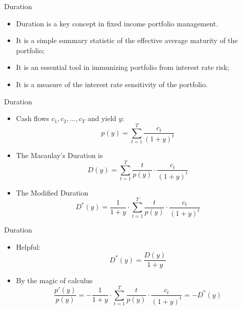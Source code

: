 \documentclass{beamer}
\begin{document}
\begin{frame}{Duration}
    \begin{itemize}
        \item Duration is a key concept in fixed income portfolio management. 
        \item  It is a simple summary statistic of the effective average maturity of the portfolio;
        \item  It is an essential tool in immunizing portfolio from interest rate risk;
        \item  It is a measure of the interest rate sensitivity of the portfolio.
    \end{itemize}
\end{frame}

\begin{frame}{Duration}
\begin{itemize}
\item Cash flows $c_{1},c_{2},\ldots,c_{T}$ and yield $y$:
\begin{equation}
p(y)=\sum_{t=1}^{T}{\frac{c_{t}}{(1+y)^{t}}}
\end{equation}
\item The Macaulay's Duration is
    \begin{equation}
        D(y)=\sum_{t=1}^{T}{\frac{t}{p(y)}\cdot\frac{c_{t}}{(1+y)^{t}}}
    \end{equation}
\item The Modified Duration
    \begin{equation}
        D^{*}(y)=\frac{1}{1+y}\cdot\sum_{t=1}^{T}{\frac{t}{p(y)}\cdot\frac{c_{t}}{(1+y)^{t}}}
    \end{equation}
\end{itemize}
\end{frame}

\begin{frame}{Duration}
\begin{itemize}
    \item Helpful:
        \begin{equation}
            \boxed{D^{*}(y)=\frac{D(y)}{1+y}}
        \end{equation}
    \item By the magic of calculus
\begin{equation}
    \frac{p'(y)}{p(y)}=-\frac{1}{1+y}\cdot\sum_{t=1}^{T}{\frac{t}{p(y)}\cdot\frac{c_{t}}{(1+y)^{t}}}=-D^{*}(y)
\end{equation}
\end{itemize}
\end{frame}
\end{document}
